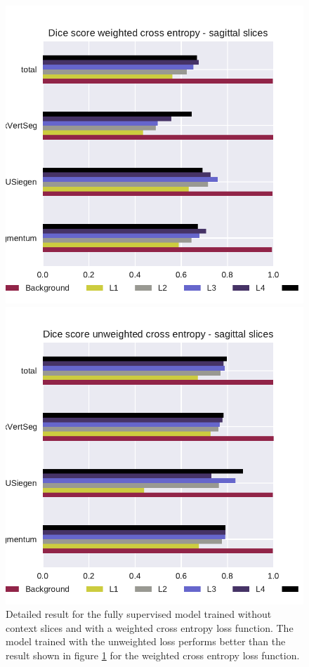\begin{figure}
    \centering
    \begin{minipage}{.98\textwidth}
        \includegraphics[width=.98\textwidth]{images/full_perClass_perSource_weighted.pdf}
    \end{minipage} 
    \begin{minipage}{0.98\textwidth}
        \includegraphics[width=.98\textwidth]{images/full_perClass_perSource_notweighted.pdf}
    \end{minipage}
    \caption{Detailed result for the fully supervised model trained without context slices and with a weighted cross entropy loss function.
    The model trained with the unweighted loss performs better than the result shown in figure \ref{fig:referenceWeighted} for the weighted cross entropy loss function.
    \label{fig:referenceWeighted} 
    }
\end{figure}

